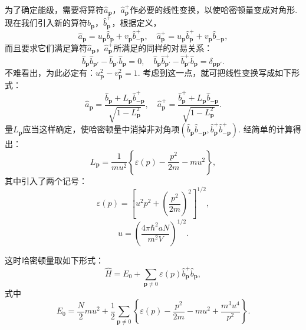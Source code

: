 为了确定能级，需要将算符$\hat{a}_{\bm{p}}$，$\hat{a}^{+}_{\bm{p}}$作必要的线性变换，以使哈密顿量变成对角形. 现在我们引入新的算符$\hat{b}_{\bm{p}}$，$\hat{b}^{+}_{\bm{p}}$，根据定义，
\begin{equation*}
\hat{a}_{\bm{p}}=u_{\bm{p}}\hat{b}_{\bm{p}}+v_{\bm{p}}\hat{b}^{+}_{-\bm{p}},\quad
\hat{a}^{+}_{\bm{p}}=u_{\bm{p}}\hat{b}^{+}_{\bm{p}}+v_{\bm{p}}\hat{b}_{-\bm{p}},
\end{equation*}
而且要求它们满足算符$\hat{a}_{\bm{p}}$，$\hat{a}^{+}_{\bm{p}}$所满足的同样的对易关系：
\begin{equation*}
\hat{b}_{\bm{p}}\hat{b}_{\bm{p}'}-\hat{b}_{\bm{p}'}\hat{b}_{\bm{p}}=0,\quad
\hat{b}_{\bm{p}}\hat{b}^{+}_{\bm{p}'}-\hat{b}^{+}_{\bm{p}'}\hat{b}_{\bm{p}}=\delta_{\bm{p}\bm{p}'}.
\end{equation*}
不难看出，为此必定有：$u^{2}_{\bm{p}}-v^{2}_{\bm{p}}=1$. 考虑到这一点，就可把线性变换写成如下形式：
\begin{equation}
\hat{a}_{\bm{p}}=\frac{\hat{b}_{\bm{p}}+L_{\bm{p}}\hat{b}^{+}_{-\bm{p}}}{\sqrt{1-L^{2}_{\bm{p}}}},\quad
\hat{a}^{+}_{\bm{p}}=\frac{\hat{b}^{+}_{\bm{p}}+L_{\bm{p}}\hat{b}_{-\bm{p}}}{\sqrt{1-L^{2}_{\bm{p}}}}.
\label{25.8}
\end{equation}
量$L_{\bm{p}}$应当这样确定，使哈密顿量中消掉非对角项$(\hat{b}_{\bm{p}}\hat{b}_{-\bm{p}},\hat{b}^{+}_{\bm{p}}\hat{b}^{+}_{-\bm{p}})$. 经简单的计算得出：
\begin{equation}
L_{\bm{p}}=\frac{1}{mu^{2}}\left\{\varepsilon(p)-\frac{p^{2}}{2m}-mu^{2}\right\},
\label{25.9}
\end{equation}
其中引入了两个记号：
\begin{equation}
\varepsilon(p)=\left[u^{2}p^{2}+\left(\frac{p^{2}}{2m}\right)^{2}\right]^{1/2},
\label{25.10}
\end{equation}
\begin{equation}
u=\left(\frac{4\pi\hbar^{2}aN}{m^{2}V}\right)^{1/2}.
\label{25.11}
\end{equation}

这时哈密顿量取如下形式：
\begin{equation}
\hat{H}=E_{0}+\sum_{\bm{p}\neq 0}\varepsilon(p)\hat{b}^{+}_{\bm{p}}\hat{b}_{\bm{p}},
\label{25.12}
\end{equation}
式中
\begin{equation}
E_{0}=\frac{N}{2}mu^{2}+\frac{1}{2}\sum_{\bm{p}\neq 0}
\left\{\varepsilon(p)-\frac{p^{2}}{2m}-mu^{2}+\frac{m^{3}u^{4}}{p^{2}}\right\}.
\label{25.13}
\end{equation}

